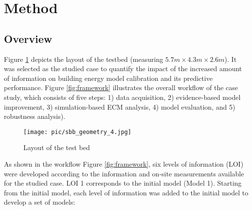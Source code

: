 \documentclass[3p,times,12pt]{elsarticle}
\begin{document}
\begin{sloppypar}
\section{Method}
\label{S:2}

\subsection{Overview} 
\label{S:2.1}
Figure \ref{fig:testbed} depicts the layout of the testbed (measuring $5.7m \times 4.3m \times 2.6m$). It was selected as the studied case to quantify the impact of the increased amount of information on building energy model calibration and its predictive performance. Figure \ref{fig:framework} illustrates the overall workflow of the case study, which consists of five steps:  
1) data acquisition, 2) evidence-based model improvement, 3) simulation-based ECM analysis, 4) model evaluation, and 5) robustness analysis). 

\begin{figure}[H]
\centering\texttt{[image: pic/sbb\_geometry\_4.jpg]}
\caption{Layout of the test bed}
\label{fig:testbed}
\end{figure}

As shown in the workflow Figure \ref{fig:framework}, six levels of information (LOI) were developed according to the information and on-site measurements available for the studied case. LOI 1 corresponds to the initial model (Model 1). Starting from the initial model, each level of information was added to the initial model to develop a set of models:


\end{sloppypar}
\end{document}
